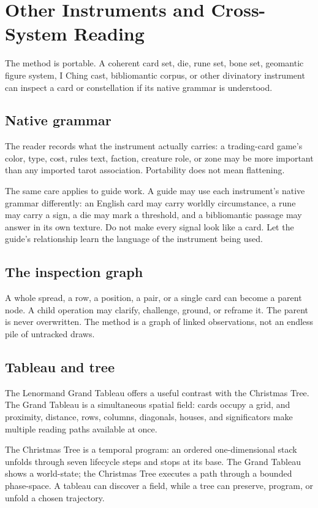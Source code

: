 \chapter{Other Instruments and Cross-System Reading}

The method is portable. A coherent card set, die, rune set, bone set, geomantic
figure system, I Ching cast, bibliomantic corpus, or other divinatory instrument
can inspect a card or constellation if its native grammar is understood.

\section{Native grammar}

The reader records what the instrument actually carries: a trading-card game's
color, type, cost, rules text, faction, creature role, or zone may be more
important than any imported tarot association. Portability does not mean
flattening.

The same care applies to guide work. A guide may use each instrument's native
grammar differently: an English card may carry worldly circumstance, a rune may
carry a sign, a die may mark a threshold, and a bibliomantic passage may answer
in its own texture. Do not make every signal look like a card. Let the guide's
relationship learn the language of the instrument being used.

\section{The inspection graph}

A whole spread, a row, a position, a pair, or a single card can become a parent
node. A child operation may clarify, challenge, ground, or reframe it. The
parent is never overwritten. The method is a graph of linked observations, not
an endless pile of untracked draws.

\section{Tableau and tree}

The Lenormand Grand Tableau offers a useful contrast with the Christmas Tree.
The Grand Tableau is a simultaneous spatial field: cards occupy a grid, and
proximity, distance, rows, columns, diagonals, houses, and significators make
multiple reading paths available at once.

The Christmas Tree is a temporal program: an ordered one-dimensional stack
unfolds through seven lifecycle steps and stops at its base. The Grand Tableau
shows a world-state; the Christmas Tree executes a path through a bounded
phase-space. A tableau can discover a field, while a tree can preserve,
program, or unfold a chosen trajectory.

